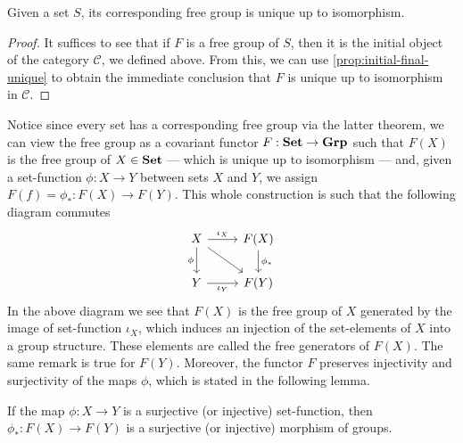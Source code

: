 \begin{corollary}\label{cor:free-group-unique-iso}
Given a set \(S\), its corresponding free group is unique up to isomorphism.
\end{corollary}

\begin{proof}
It suffices to see that if \(F\) is a free group of \(S\), then it is the
initial object of the category \(\mathcal C\), we defined above. From this, we
can use \cref{prop:initial-final-unique} to obtain the immediate conclusion that
\(F\) is unique up to isomorphism in \(\mathcal C\).
\end{proof}


Notice since every set has a corresponding free group via the latter theorem, we
can view the free group as a covariant functor \(F: {\textbf{Set}} \to {\textbf{Grp}}\) such that
\(F(X)\) is the free group of \(X \in {\textbf{Set}}\) --- which is unique up to
isomorphism --- and, given a set-function \(\phi: X \to Y\) between sets \(X\)
and \(Y\), we assign \(F(f) = \phi_{*}: F(X) \to F(Y)\). This whole construction
is such that the following diagram commutes
\begin{equation}\label{eq:free-functor}
  \begin{tikzcd}
    X \ar[r, "\iota_X"] \ar[d, swap, "\phi"] \ar[dr]
    &F(X) \ar[d, "\phi_{*}"] \\
    Y \ar[r, swap, "\iota_Y"] &F(Y)
  \end{tikzcd}
\end{equation}
In the above diagram we see that \(F(X)\) is the free group of \(X\) generated
by the image of set-function \(\iota_X\), which induces an injection of the
set-elements of \(X\) into a group structure. These elements are called the free
generators of \(F(X)\). The same remark is true for \(F(Y)\). Moreover, the
functor \(F\) preserves injectivity and surjectivity of the maps \(\phi\), which
is stated in the following lemma.

\begin{lemma}\label{lem:free-func-preserves-inj-sur}
If the map \(\phi: X \to Y\) is a surjective (or injective) set-function, then
\(\phi_{*}: F(X) \to F(Y)\) is a surjective (or injective) morphism of groups.
\end{lemma}


